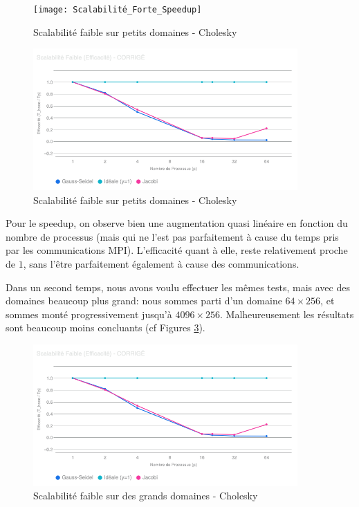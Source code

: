 \documentclass{article}
\begin{document}
\begin{figure}[H]
    \centering
    \texttt{[image: Scalabilité\_Forte\_Speedup]}
    \caption{Scalabilité faible sur petits domaines - Cholesky}
    \label{fig:strongCholeskySmol}
\end{figure}

\begin{figure}[H]
    \centering
    \includegraphics[width=0.9\textwidth]{Scalabilité_Faible_Efficacité}
    \caption{Scalabilité faible sur petits domaines - Cholesky}
    \label{fig:weakCholeskySmol}
\end{figure}

Pour le speedup, on observe bien une augmentation quasi linéaire en fonction du nombre de processus (mais qui ne l'est pas parfaitement à cause du temps pris par les communications MPI). L'efficacité quant à elle, reste relativement proche de $1$, sans l'être parfaitement également à cause des communications.

Dans un second temps, nous avons voulu effectuer les mêmes tests, mais avec des domaines beaucoup plus grand: nous sommes parti d'un domaine $64\times 256$, et sommes monté progressivement jusqu'à $4096\times 256$. Malheureusement les résultats sont beaucoup moins concluants (cf Figures \ref{fig:weakCholeskyBig}).

\begin{figure}[H]
    \centering
    \includegraphics[width=0.9\textwidth]{Scalabilité_Faible_Efficacité}
    \caption{Scalabilité faible sur des grands domaines - Cholesky}
    \label{fig:weakCholeskyBig}
\end{figure}
\end{document}
